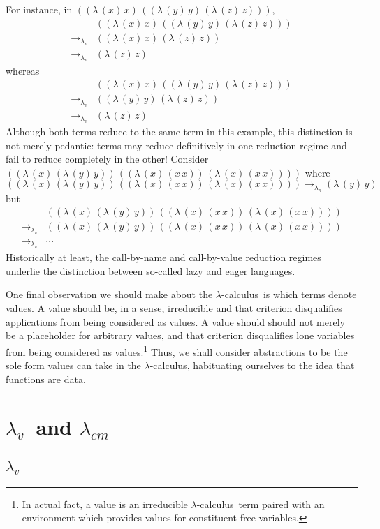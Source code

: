 \documentclass[ms,electronic,twosidetoc,letterpaper,chaptercenter,parttop]{byumsphd}
\newcommand{\lc}{$\lambda$-calculus}
\newcommand{\lv}{$\lambda_v$}
\newcommand{\cm}{$\lambda_{cm}$}
\newcommand{\lvrr}{\rightarrow_{\lambda_v}}
\newcommand{\larr}{\rightarrow_{\lambda_n}}
\newcommand{\abs}[2]{(\lambda\,(#1)\,#2)}
\newcommand{\app}[2]{(#1\,#2)}
\begin{document}
For instance, in $\app{\abs{x}{x}}{\app{\abs{y}{y}}{\abs{z}{z}}}$,
\begin{align*}
      &\app{\abs{x}{x}}{\app{\abs{y}{y}}{\abs{z}{z}}}\\
\lvrr &\app{\abs{x}{x}}{\abs{z}{z}}\\
\lvrr &\abs{z}{z}
\end{align*}
whereas
\begin{align*}
      &\app{\abs{x}{x}}{\app{\abs{y}{y}}{\abs{z}{z}}}\\
\lvrr &\app{\abs{y}{y}}{\abs{z}{z}}\\
\lvrr &\abs{z}{z}
\end{align*}
Although both terms reduce to the same term in this example, this distinction is not
merely pedantic: terms may reduce definitively in one reduction regime and fail to reduce
completely in the other! Consider
$\app{\abs{x}{\abs{y}{y}}}{\app{\abs{x}{\app{x}{x}}}{\abs{x}{\app{x}{x}}}}$ where
\[
\app{\abs{x}{\abs{y}{y}}}{\app{\abs{x}{\app{x}{x}}}{\abs{x}{\app{x}{x}}}}\larr\abs{y}{y}
\]
but
\begin{align*}
      &\app{\abs{x}{\abs{y}{y}}}{\app{\abs{x}{\app{x}{x}}}{\abs{x}{\app{x}{x}}}}\\
\lvrr &\app{\abs{x}{\abs{y}{y}}}{\app{\abs{x}{\app{x}{x}}}{\abs{x}{\app{x}{x}}}}\\
\lvrr &\cdots
\end{align*}
Historically at least, the call-by-name and call-by-value reduction regimes underlie the
distinction between so-called lazy and eager languages.

One final observation we should make about the \lc\ is which terms denote values. A value
should be, in a sense, irreducible and that criterion disqualifies applications from being
considered as values. A value should should not merely be a placeholder for arbitrary
values, and that criterion disqualifies lone variables from being considered as
values.\footnote{In actual fact, a value is an irreducible \lc\ term paired with an
environment which provides values for constituent free variables.} Thus, we shall consider
abstractions to be the sole form values can take in the \lc, habituating ourselves to the
idea that functions are data.

\chapter{\lv\ and \cm}

\section{\lv}
\end{document}
